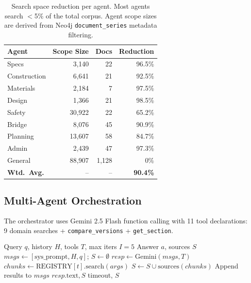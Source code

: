\documentclass{article}
\newcommand{\systemname}{\textsc{MASDR-RAG}}
\begin{document}
\begin{table}[t]
\centering
\footnotesize
\begin{tabular}{l r r r}
\toprule
\textbf{Agent} & \textbf{Scope Size} & \textbf{Docs} & \textbf{Reduction} \\
\midrule
Specs         & 3,140  & 22    & 96.5\% \\
Construction  & 6,641  & 21    & 92.5\% \\
Materials     & 2,184  & 7     & 97.5\% \\
Design        & 1,366  & 21    & 98.5\% \\
Safety        & 30,922 & 22    & 65.2\% \\
Bridge        & 8,076  & 45    & 90.9\% \\
Planning      & 13,607 & 58    & 84.7\% \\
Admin         & 2,439  & 47    & 97.3\% \\
General       & 88,907 & 1,128 & 0\% \\
\midrule
\textbf{Wtd.\ Avg.} & -- & -- & \textbf{90.4\%} \\
\bottomrule
\end{tabular}
\caption{Search space reduction per agent. Most agents search $<$5\% of the total corpus. Agent scope sizes are derived from Neo4j \texttt{document\_series} metadata filtering.}
\label{tab:search_space}
\end{table}

\subsection{Multi-Agent Orchestration}
\label{sec:orchestrator}

The orchestrator uses Gemini 2.5 Flash function calling with 11 tool declarations: 9 domain searches + \texttt{compare\_versions} + \texttt{get\_section}.

\begin{algorithm}[H]
\small
\caption{\systemname{} Orchestration}
\label{alg:orchestrator}
\begin{algorithmic}[1]
\REQUIRE Query $q$, history $H$, tools $T$, max iters $I{=}5$
\ENSURE Answer $a$, sources $S$
\STATE $msgs \leftarrow [\text{sys\_prompt}, H, q]$; $S \leftarrow \emptyset$
    \STATE $resp \leftarrow \text{Gemini}(msgs, T)$
            \STATE $chunks \leftarrow \text{REGISTRY}[t].\text{search}(args)$
            \STATE $S \leftarrow S \cup \text{sources}(chunks)$
        \ENDFOR
        \STATE Append results to $msgs$
    \ELSE
        \RETURN $resp.\text{text}, S$
    \ENDIF
\ENDFOR
\RETURN timeout, $S$
\end{algorithmic}
\end{algorithm}
\end{document}
